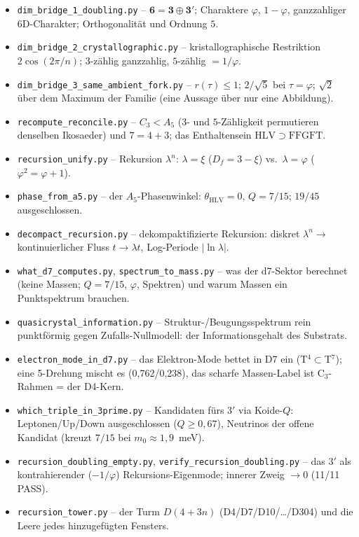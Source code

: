 \begin{itemize}
\item \texttt{dim\_bridge\_1\_doubling.py} -- $\mathbf 6=\mathbf 3\oplus\mathbf 3'$;
Charaktere $\varphi$, $1-\varphi$, ganzzahliger $6$D-Charakter; Orthogonalität und Ordnung
$5$.
\item \texttt{dim\_bridge\_2\_crystallographic.py} -- kristallographische Restriktion
$2\cos(2\pi/n)$; $3$-zählig ganzzahlig, $5$-zählig $=1/\varphi$.
\item \texttt{dim\_bridge\_3\_same\_ambient\_fork.py} -- $r(\tau)\le1$; $2/\sqrt5$ bei
$\tau=\varphi$; $\sqrt2$ über dem Maximum der Familie (eine Aussage über nur eine Abbildung).
\item \texttt{recompute\_reconcile.py} -- $C_3<A_5$ ($3$- und $5$-Zähligkeit permutieren
denselben Ikosaeder) und $7=4+3$; das Enthaltensein $\mathrm{HLV}\supset\mathrm{FFGFT}$.
\item \texttt{recursion\_unify.py} -- Rekursion $\lambda^n$: $\lambda=\xi$ ($D_f=3-\xi$) vs.\ $\lambda=\varphi$ ($\varphi^2=\varphi+1$).
\item \texttt{phase\_from\_a5.py} -- der $A_5$-Phasenwinkel: $\theta_{\mathrm{HLV}}=0$, $Q=7/15$; $19/45$ ausgeschlossen.
\item \texttt{decompact\_recursion.py} -- dekompaktifizierte Rekursion: diskret $\lambda^n\to$ kontinuierlicher Fluss $t\to\lambda t$, Log-Periode $|\ln\lambda|$.
\item \texttt{what\_d7\_computes.py}, \texttt{spectrum\_to\_mass.py} -- was der d7-Sektor berechnet (keine Massen; $Q=7/15$, $\varphi$, Spektren) und warum Massen ein Punktspektrum brauchen.
\item \texttt{quasicrystal\_information.py} -- Struktur-/Beugungsspektrum rein punktf\"ormig gegen Zufalls-Nullmodell: der Informationsgehalt des Substrats.
\item \texttt{electron\_mode\_in\_d7.py} -- das Elektron-Mode bettet in D7 ein (T$^4\subset$T$^7$); eine 5-Drehung mischt es (0,762/0,238), das scharfe Massen-Label ist C$_3$-Rahmen = der D4-Kern.
\item \texttt{which\_triple\_in\_3prime.py} -- Kandidaten f\"urs 3$'$ via Koide-$Q$: Leptonen/Up/Down ausgeschlossen ($Q\ge0{,}67$), Neutrinos der offene Kandidat (kreuzt $7/15$ bei $m_0\approx1{,}9$~meV).
\item \texttt{recursion\_doubling\_empty.py}, \texttt{verify\_recursion\_doubling.py} -- das 3$'$ als kontrahierender ($-1/\varphi$) Rekursions-Eigenmode; innerer Zweig $\to0$ (11/11 PASS).
\item \texttt{recursion\_tower.py} -- der Turm $D(4+3n)$ (D4/D7/D10/\dots/D304) und die Leere jedes hinzugef\"ugten Fensters.

\end{itemize}

